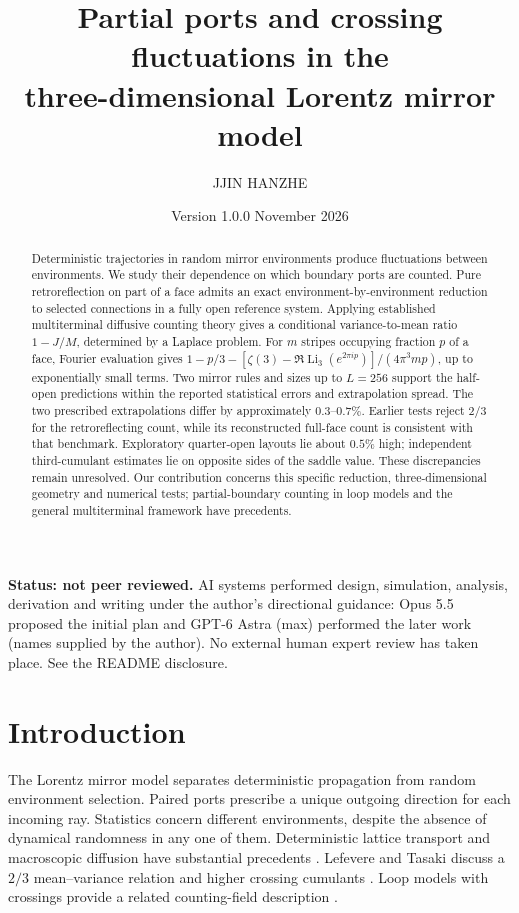 \documentclass[11pt,a4paper]{article}
\title{Partial ports and crossing fluctuations in the\\three-dimensional Lorentz mirror model}
\author{JJIN HANZHE}
\date{Version 1.0.0 \quad 3 November 2026}
\newcommand{\Li}{\operatorname{Li}}
\begin{document}
\maketitle
\begin{abstract}
Deterministic trajectories in random mirror environments produce fluctuations
between environments. We study their dependence on which boundary ports are
counted. Pure retroreflection on part of a face admits an exact
environment-by-environment reduction to selected connections in a fully open
reference system. Applying established multiterminal diffusive counting theory
gives a conditional variance-to-mean ratio \(1-J/M\), determined by a Laplace
problem. For \(m\) stripes occupying fraction \(p\) of a face, Fourier
evaluation gives
\(1-p/3-[\zeta(3)-\Re\Li_3(e^{2\pi ip})]/(4\pi^3mp)\), up to exponentially
small terms. Two mirror rules and sizes up to \(L=256\) support the half-open
predictions within the reported statistical errors and extrapolation spread.
The two prescribed extrapolations differ by approximately \(0.3\)--\(0.7\%\).
Earlier tests reject \(2/3\) for the retroreflecting count, while its reconstructed
full-face count is consistent with that benchmark. Exploratory quarter-open
layouts lie about \(0.5\%\) high; independent third-cumulant estimates lie on
opposite sides of the saddle value. These discrepancies remain unresolved.
Our contribution concerns this specific reduction, three-dimensional geometry
and numerical tests; partial-boundary counting in loop models and the general
multiterminal framework have precedents.
\end{abstract}
\noindent\textbf{Status: not peer reviewed.}
AI systems performed design, simulation, analysis, derivation and writing under
the author's directional guidance: Opus 5.5 proposed the initial plan and
GPT-6 Astra (max) performed the later work (names supplied by the author).
No external human expert review has taken place. See the README disclosure.

\section{Introduction}
The Lorentz mirror model separates deterministic propagation from random
environment selection. Paired ports prescribe a unique outgoing direction
for each incoming ray. Statistics concern different environments, despite the
absence of dynamical randomness in any one of them. Deterministic lattice
transport and macroscopic diffusion have substantial precedents
\cite{Ruijgrok,Chiffaudel}. Lefevere and Tasaki discuss a \(2/3\)
mean--variance relation and higher crossing cumulants \cite{LT}.
Loop models with crossings provide a related counting-field description
\cite{NSSO}.
\end{document}
